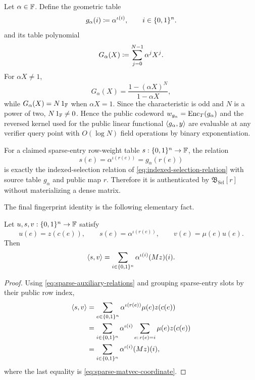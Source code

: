 Let $\alpha\in\mathbb{F}$.  Define the geometric table
\begin{equation}
  g_{\alpha}(i)
  \coloneqq
  \alpha^{\iota(i)},
  \qquad i\in\{0,1\}^n.
  \label{eq:geometric-row-table}
\end{equation}
and its table polynomial
\begin{equation}
  G_{\alpha}(X)
  \coloneqq
  \sum_{j=0}^{N-1}\alpha^jX^j.
  \label{eq:geometric-row-polynomial}
\end{equation}
For $\alpha X\ne1$,
\begin{equation}
  G_{\alpha}(X)
  =\frac{1-(\alpha X)^N}{1-\alpha X},
  \label{eq:geometric-series-formula}
\end{equation}
while $G_{\alpha}(X)=N\,1_{\mathbb{F}}$ when $\alpha X=1$.  Since the characteristic is odd and $N$ is a power of two, $N\,1_{\mathbb{F}}\ne0$.  Hence the public codeword $w_{g_\alpha}=\operatorname{Enc}_T(g_\alpha)$ and the reversed kernel used for the public linear functional $\left\langle g_\alpha,y\right\rangle$ are evaluable at any verifier query point with $O(\log N)$ field operations by binary exponentiation.

For a claimed sparse-entry row-weight table $s:\{0,1\}^n\to\mathbb{F}$, the relation
\begin{equation}
  s(e)=\alpha^{\iota(r(e))}
  =g_\alpha(r(e))
  \label{eq:row-weight-selection}
\end{equation}
is exactly the indexed-selection relation of \eqref{eq:indexed-selection-relation} with source table $g_\alpha$ and public map $r$.  Therefore it is authenticated by $\mathfrak B_{\mathrm{Sel}}[r]$ without materializing a dense matrix.

The final fingerprint identity is the following elementary fact.

\begin{lemma}
\label{lem:sparse-contraction}
Let $u,s,v:\{0,1\}^n\to\mathbb{F}$ satisfy
\begin{equation}
  u(e)=z(c(e)),
  \qquad
  s(e)=\alpha^{\iota(r(e))},
  \qquad
  v(e)=\mu(e)u(e).
  \label{eq:sparse-auxiliary-relations}
\end{equation}
Then
\begin{equation}
  \left\langle s,v\right\rangle
  =
  \sum_{i\in\{0,1\}^n}\alpha^{\iota(i)}(Mz)(i).
  \label{eq:sparse-contraction-identity}
\end{equation}
\end{lemma}

\begin{proof}
Using \eqref{eq:sparse-auxiliary-relations} and grouping sparse-entry slots by their public row index,
\begin{align*}
  \left\langle s,v\right\rangle
  &=\sum_{e\in\{0,1\}^n}
    \alpha^{\iota(r(e))}\mu(e)z(c(e))\\
  &=\sum_{i\in\{0,1\}^n}\alpha^{\iota(i)}
    \sum_{e:\,r(e)=i}\mu(e)z(c(e))\\
  &=\sum_{i\in\{0,1\}^n}\alpha^{\iota(i)}(Mz)(i),
\end{align*}
where the last equality is \eqref{eq:sparse-matvec-coordinate}.
\end{proof}

